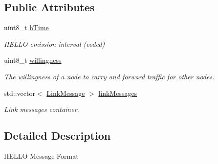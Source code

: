 \subsection*{Public Attributes}
\begin{DoxyCompactItemize}
\item 
uint8\+\_\+t \hyperlink{structns3_1_1olsr_1_1MessageHeader_1_1Hello_ab3ca4a7d3f354ac3c022cf9e7f799ae2}{h\+Time}
\begin{DoxyCompactList}\small\item\em H\+E\+L\+LO emission interval (coded) \end{DoxyCompactList}\item 
uint8\+\_\+t \hyperlink{structns3_1_1olsr_1_1MessageHeader_1_1Hello_a6458c9b671b767990245f81d1c64c56f}{willingness}
\begin{DoxyCompactList}\small\item\em The willingness of a node to carry and forward traffic for other nodes. \end{DoxyCompactList}\item 
std\+::vector$<$ \hyperlink{structns3_1_1olsr_1_1MessageHeader_1_1Hello_1_1LinkMessage}{Link\+Message} $>$ \hyperlink{structns3_1_1olsr_1_1MessageHeader_1_1Hello_aa6eb8d2a413314c764f5eaf669655f59}{link\+Messages}
\begin{DoxyCompactList}\small\item\em Link messages container. \end{DoxyCompactList}\end{DoxyCompactItemize}


\subsection{Detailed Description}
H\+E\+L\+LO Message Format

